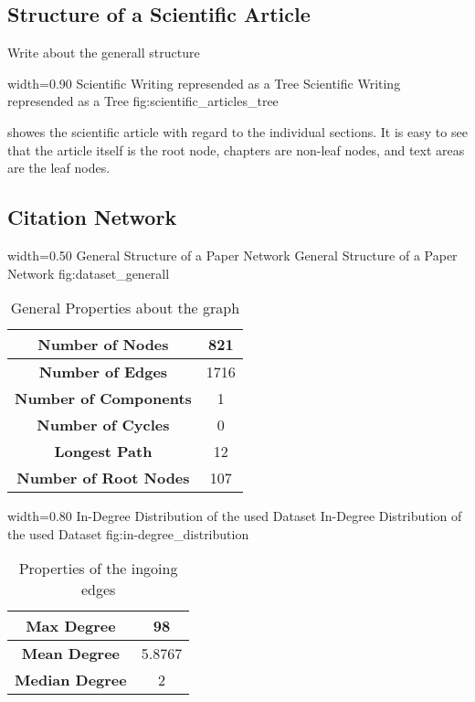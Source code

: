\subsection{Structure of a Scientific Article}
\label{sec:structure_scientific_article}

Write about the generall structure

      {width=0.90\textwidth}
      {Scientific Writing represended as a Tree}
      {Scientific Writing represended as a Tree}
      {fig:scientific_articles_tree}

 showes the scientific article with regard to the individual sections. It is easy to see that the article itself is the root node, chapters are non-leaf nodes, and text areas are the leaf nodes.

\subsection{Citation Network}
\label{sec:citation_network}

      {width=0.50\textwidth}
      {General Structure of a Paper Network}
      {General Structure of a Paper Network}
      {fig:dataset_generall}

\begin{table}
  \centering
  \begin{tabular}{ | c | c | }
    \hline
    \textbf{Number of Nodes} & 821 \\ \hline
    \textbf{Number of Edges} & 1716 \\ \hline
    \textbf{Number of Components} & 1 \\ \hline
    \textbf{Number of Cycles} & 0 \\ \hline
    \textbf{Longest Path} & 12 \\ \hline
    \textbf{Number of Root Nodes} & 107 \\ \hline
  \end{tabular}
  \caption[General Properties about the graph in the used dataset]{General Properties about the graph}
  \label{tbl:general_properties_about_the_graph}
\end{table}


      {width=0.80\textwidth}
      {In-Degree Distribution of the used Dataset}
      {In-Degree Distribution of the used Dataset}
      {fig:in-degree_distribution}

\begin{table}
  \centering
  \begin{tabular}{ | c | c | }
    \hline
    \textbf{Max Degree} & 98 \\ \hline
    \textbf{Mean Degree} & 5.8767 \\ \hline
    \textbf{Median Degree} & 2 \\ \hline
  \end{tabular}
  \caption[Properties of the ingoing edges in the used dataset]{Properties of the ingoing edges}
  \label{tbl:properties_ingoing_edges}
\end{table}

